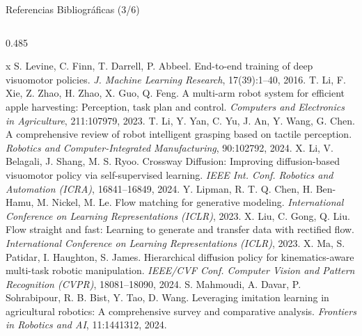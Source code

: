 \documentclass[aspectratio=169,10pt,xcolor={dvipsnames,table}]{beamer}
\begin{document}
\begin{frame}{Referencias Bibliográficas (3/6)}
\begin{columns}[T, onlytextwidth]
\begin{column}{0.485\textwidth}
\begin{thebibliography}{x}
         S. Levine, C. Finn, T. Darrell, P. Abbeel. \newblock End-to-end training of deep visuomotor policies. \newblock \emph{J. Machine Learning Research}, 17(39):1--40, 2016.
         T. Li, F. Xie, Z. Zhao, H. Zhao, X. Guo, Q. Feng. \newblock A multi-arm robot system for efficient apple harvesting: Perception, task plan and control. \newblock \emph{Computers and Electronics in Agriculture}, 211:107979, 2023.
         T. Li, Y. Yan, C. Yu, J. An, Y. Wang, G. Chen. \newblock A comprehensive review of robot intelligent grasping based on tactile perception. \newblock \emph{Robotics and Computer-Integrated Manufacturing}, 90:102792, 2024.
         X. Li, V. Belagali, J. Shang, M. S. Ryoo. \newblock Crossway Diffusion: Improving diffusion-based visuomotor policy via self-supervised learning. \newblock \emph{IEEE Int. Conf. Robotics and Automation (ICRA)}, 16841--16849, 2024.
         Y. Lipman, R. T. Q. Chen, H. Ben-Hamu, M. Nickel, M. Le. \newblock Flow matching for generative modeling. \newblock \emph{International Conference on Learning Representations (ICLR)}, 2023.
         X. Liu, C. Gong, Q. Liu. \newblock Flow straight and fast: Learning to generate and transfer data with rectified flow. \newblock \emph{International Conference on Learning Representations (ICLR)}, 2023.
         X. Ma, S. Patidar, I. Haughton, S. James. \newblock Hierarchical diffusion policy for kinematics-aware multi-task robotic manipulation. \newblock \emph{IEEE/CVF Conf. Computer Vision and Pattern Recognition (CVPR)}, 18081--18090, 2024.
         S. Mahmoudi, A. Davar, P. Sohrabipour, R. B. Bist, Y. Tao, D. Wang. \newblock Leveraging imitation learning in agricultural robotics: A comprehensive survey and comparative analysis. \newblock \emph{Frontiers in Robotics and AI}, 11:1441312, 2024.
      \end{thebibliography}
    \end{column}
  \end{columns}
\end{frame}
\end{document}
